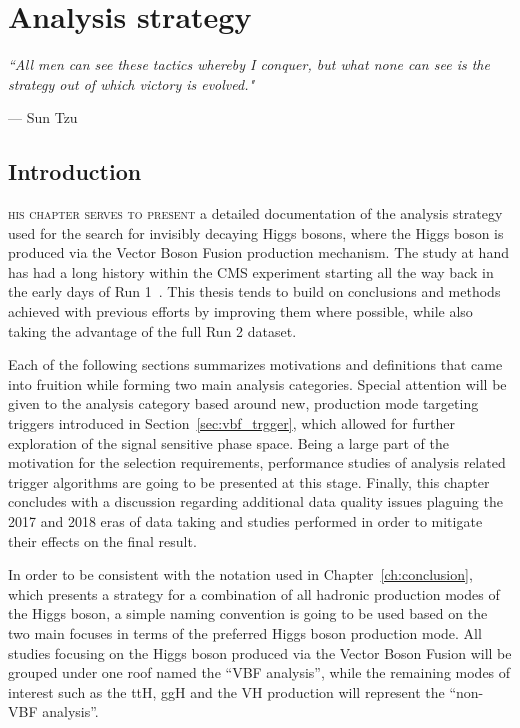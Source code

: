 \chapter{Analysis strategy}
\label{ch:an_strategy}
\epigraph{\itshape``All men can see these tactics whereby I conquer, but what none can see is the strategy out of which victory is evolved."}{--- \textup{Sun Tzu}}

\section{Introduction}
\hspace{10pt}\lettrine[lines=2]{}{his chapter serves to present} a detailed documentation of the analysis strategy used for the search for invisibly decaying Higgs bosons, where the Higgs boson is produced via the Vector Boson Fusion production mechanism. The study at hand has had a long history within the CMS experiment starting all the way back in the early days of Run 1~\cite{paper:HIG_17_023}. This thesis tends to build on conclusions and methods achieved with previous efforts by improving them where possible, while also taking the advantage of the full Run 2 dataset.

\hspace{10pt} Each of the following sections summarizes motivations and definitions that came into fruition while forming two main analysis categories. Special attention will be given to the analysis category based around new, production mode targeting triggers introduced in Section~\ref{sec:vbf_trgger}, which allowed for further exploration of the signal sensitive phase space. Being a large part of the motivation for the selection requirements, performance studies of analysis related trigger algorithms are going to be presented at this stage. Finally, this chapter concludes with a discussion regarding additional data quality issues plaguing the 2017 and 2018 eras of data taking and studies performed in order to mitigate their effects on the final result.

\hspace{10pt} In order to be consistent with the notation used in Chapter~\ref{ch:conclusion}, which presents a strategy for a combination of all hadronic production modes of the Higgs boson, a simple naming convention is going to be used based on the two main focuses in terms of the preferred Higgs boson production mode. All studies focusing on the Higgs boson produced via the Vector Boson Fusion will be grouped under one roof named the ``VBF analysis'', while the remaining modes of interest such as the ttH, ggH and the VH production will represent the ``non-VBF analysis''.

